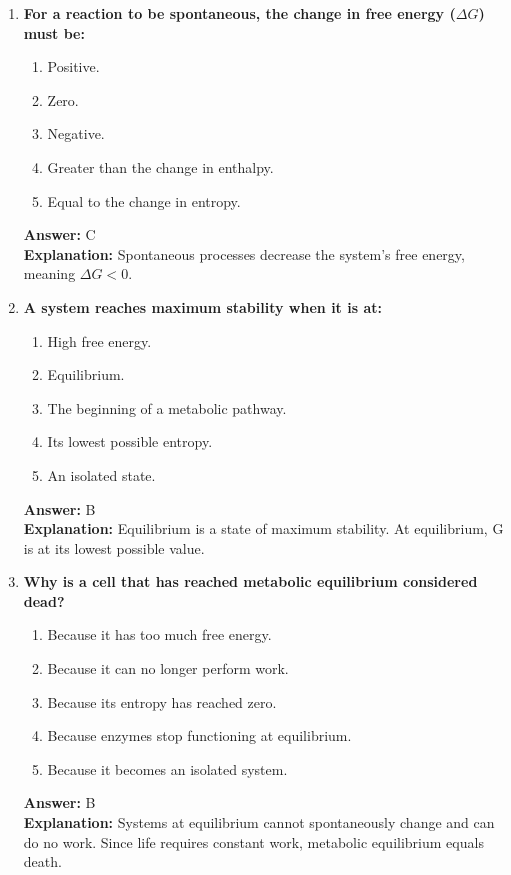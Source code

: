 \documentclass[11pt, a4paper]{article}
\begin{document}
\begin{enumerate}[leftmargin=*, label=\arabic*.]
\item \textbf{For a reaction to be spontaneous, the change in free energy ($\Delta G$) must be:}
\begin{enumerate}[label=\Alph*.]
    \item Positive.
    \item Zero.
    \item Negative.
    \item Greater than the change in enthalpy.
    \item Equal to the change in entropy.
\end{enumerate}
\textbf{Answer:} C \\
\textbf{Explanation:} Spontaneous processes decrease the system's free energy, meaning $\Delta G < 0$.

\item \textbf{A system reaches maximum stability when it is at:}
\begin{enumerate}[label=\Alph*.]
    \item High free energy.
    \item Equilibrium.
    \item The beginning of a metabolic pathway.
    \item Its lowest possible entropy.
    \item An isolated state.
\end{enumerate}
\textbf{Answer:} B \\
\textbf{Explanation:} Equilibrium is a state of maximum stability. At equilibrium, G is at its lowest possible value.

\item \textbf{Why is a cell that has reached metabolic equilibrium considered dead?}
\begin{enumerate}[label=\Alph*.]
    \item Because it has too much free energy.
    \item Because it can no longer perform work.
    \item Because its entropy has reached zero.
    \item Because enzymes stop functioning at equilibrium.
    \item Because it becomes an isolated system.
\end{enumerate}
\textbf{Answer:} B \\
\textbf{Explanation:} Systems at equilibrium cannot spontaneously change and can do no work. Since life requires constant work, metabolic equilibrium equals death.


\end{enumerate}
\end{document}

